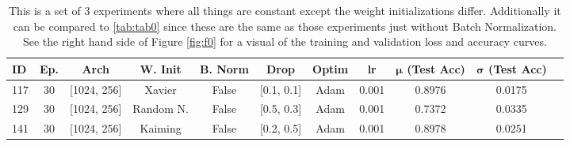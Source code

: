 \documentclass[11pt]{amsart}
\begin{document}
\begin{table}[h]
    \centering
    \begin{tabular}{|l|c|c|c|c|c|c|c|c|c|c|} %
        \hline
        \textbf{ID} & \textbf{Ep.}
        & \textbf{Arch} & \textbf{W. Init}
        & \textbf{B. Norm} & \textbf{Drop}
        & \textbf{Optim} & \textbf{lr}
	& \textbf{$\bm \mu$ (Test Acc)}
        & \textbf{$\bm \sigma$ (Test Acc)} \\ 
        \hline
        117 & 30 & [1024, 256]  & Xavier 		& False & [0.1, 0.1] & Adam & 0.001 & 0.8976 & 0.0175 \\
        \hline
        129 & 30 & [1024, 256]  & Random N. 	& False & [0.5, 0.3] & Adam & 0.001 & 0.7372 & 0.0335 \\
        \hline
        141 & 30 & [1024, 256]  & Kaiming 		& False & [0.2, 0.5] & Adam & 0.001 & 0.8978 & 0.0251 \\  
        \hline
    \end{tabular}
    \caption{This is a set of 3 experiments where all things are constant except the weight initializations differ.
    Additionally it can be compared to \ref{tab:tab0} since these are the same as those experiments just without Batch Normalization.
    See the right hand side of Figure \ref{fig:f0} for a visual of the training and validation loss and accuracy curves.}
    \label{tab:tab1}
\end{table}

\end{document}
